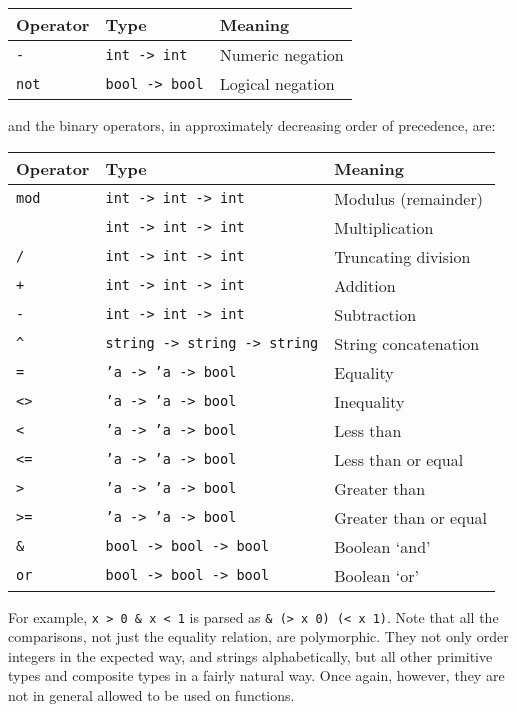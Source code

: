 \bigskip
\begin{tabular}{|l|l|l|}
\hline
Operator   & Type                             & Meaning               \\
\hline
{\tt -}       & {\tt int -> int}    & Numeric negation                \\
{\tt not}     & {\tt bool -> bool}  & Logical negation                \\
\hline
\end{tabular}
\bigskip

\noindent and the binary operators, in approximately decreasing order of
precedence, are:

\bigskip
\begin{tabular}{|l|l|l|}
\hline
Operator   & Type                             & Meaning               \\
\hline
{\tt mod}  & {\tt int -> int -> int}          & Modulus (remainder)   \\
{\tt *}    & {\tt int -> int -> int}          & Multiplication        \\
{\tt /}    & {\tt int -> int -> int}          & Truncating division   \\
{\tt +}    & {\tt int -> int -> int}          & Addition              \\
{\tt -}    & {\tt int -> int -> int}          & Subtraction           \\
{\verb+^+} & {\tt string -> string -> string} & String concatenation  \\
{\tt =}    & {\tt 'a -> 'a -> bool}           & Equality              \\
{\tt <>}   & {\tt 'a -> 'a -> bool}           & Inequality            \\
{\tt <}    & {\tt 'a -> 'a -> bool}           & Less than             \\
{\tt <=}   & {\tt 'a -> 'a -> bool}           & Less than or equal    \\
{\tt >}    & {\tt 'a -> 'a -> bool}           & Greater than          \\
{\tt >=}   & {\tt 'a -> 'a -> bool}           & Greater than or equal \\
{\tt \&}   & {\tt bool -> bool -> bool}       & Boolean `and'         \\
{\tt or}   & {\tt bool -> bool -> bool}       & Boolean `or'          \\
\hline
\end{tabular}
\bigskip

For example, {\tt x > 0 \& x < 1} is parsed as {\tt \& (> x 0) (< x 1)}. Note
that all the comparisons, not just the equality relation, are polymorphic. They
not only order integers in the expected way, and strings alphabetically, but
all other primitive types and composite types in a fairly natural way. Once
again, however, they are not in general allowed to be used on functions.

